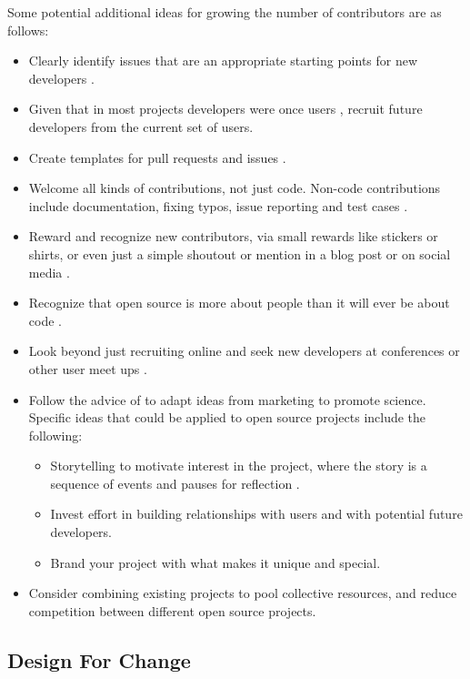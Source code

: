\documentclass[final, 3p, times, authoryear]{elsarticle}
\begin{document}
Some potential additional ideas for growing the number of contributors are
as follows:

\begin{itemize}
	\item Clearly identify issues that are an appropriate starting points for
	new developers \citep{Garcia2016, Jalan2016, Proffitt2017}.
	\item Given that in most projects developers were once users
	\citep{McQuaid2018}, recruit future developers from the current set of
	users.
	\item Create templates for pull requests and issues \citep{Jalan2016}.
    \item Welcome all kinds of contributions, not just code.  Non-code
    contributions include documentation, fixing typos, issue reporting and test
    cases \citep{Jalan2016, Proffitt2017}.
    \item Reward and recognize new contributors, via small rewards like stickers
    or shirts, or even just a simple shoutout or mention in a blog post or on
    social media \citep{Jalan2016, Proffitt2017}.
    \item Recognize that open source is more about people than it will ever be
    about code \citep{Jalan2016}.
    \item Look beyond just recruiting online and seek new developers at
    conferences or other user meet ups \citep{Garcia2016}.
    \item Follow the advice of \citet{Kuchner2012} to adapt ideas from marketing
    to promote science.  Specific ideas that could be applied to open source
    projects include the following: 
    \begin{itemize}
		\item Storytelling to motivate interest in the project, where the story
		is a sequence of events and pauses for reflection \citep[p.\
		21--22]{Kuchner2012}.
		\item Invest effort in building relationships with users and with potential future developers.
		\item Brand your project with what makes it unique and special.
	\end{itemize}
	\item Consider combining existing projects to pool collective resources, and
	reduce competition between different open source projects.
\end{itemize}

\subsection{Design For Change} \label{Sec_DesForChange}
\end{document}
